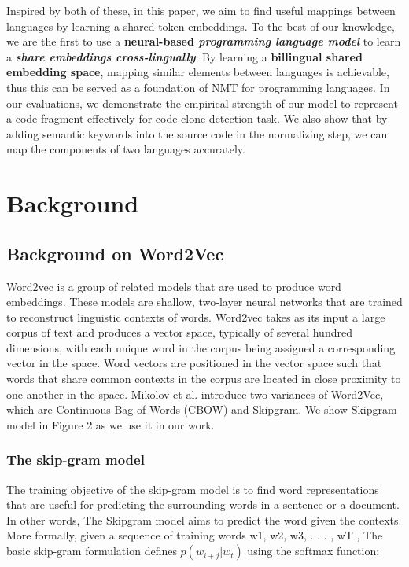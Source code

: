 Inspired by both of these, in this paper, we aim to find useful mappings between languages by learning a shared token embeddings. To the best of our knowledge, we are the first to use a \textbf{neural-based \textit{programming language model}} to learn a \textbf{\textit{share embeddings cross-lingually}}. By learning a \textbf{billingual shared embedding space}, mapping similar elements between languages is achievable, thus this can be served as a foundation of NMT for programming languages. In our evaluations, we demonstrate the empirical strength of our model to represent a code fragment effectively for code clone detection task. We also show that by adding semantic keywords into the source code in the normalizing step, we can map the components of two languages accurately. 

\section{Background}

\subsection{Background on Word2Vec}

Word2vec is a group of related models that are used to produce word embeddings. These models are shallow, two-layer neural networks that are trained to reconstruct linguistic contexts of words. Word2vec takes as its input a large corpus of text and produces a vector space, typically of several hundred dimensions, with each unique word in the corpus being assigned a corresponding vector in the space. Word vectors are positioned in the vector space such that words that share common contexts in the corpus are located in close proximity to one another in the space. Mikolov et al.\cite{mikolov2013distributed} introduce two variances of Word2Vec, which are Continuous Bag-of-Words (CBOW) and Skipgram. We show Skipgram model in Figure 2 as we use it in our work.

\subsubsection{The skip-gram model}
The training objective of the skip-gram model is to find word representations that are useful for predicting the surrounding words in a sentence or a document. In other words, The Skipgram model aims to predict the word given the contexts. More formally, given a sequence of training words w1, w2, w3, . . . , wT , The basic skip-gram formulation defines \begin{math}p(w_{i+j} | w_{t})\end{math} using the softmax function:

